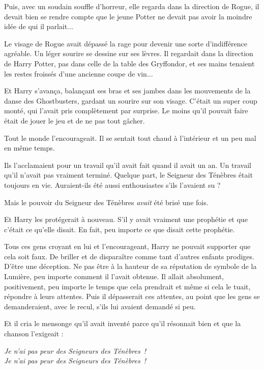 {Puis, avec un soudain souffle d'horreur, elle regarda dans la direction de Rogue, il devait bien se rendre compte que le jeune Potter ne devait pas avoir la moindre idée de qui il parlait...

Le visage de Rogue avait dépassé la rage pour devenir une sorte d'indifférence agréable. Un léger sourire se dessine sur ses lèvres. Il regardait dans la direction de Harry Potter, pas dans celle de la table des Gryffondor, et ses mains tenaient les restes froissés d'une ancienne coupe de vin...

Et Harry s'avança, balançant ses bras et ses jambes dans les mouvements de la danse des Ghostbusters, gardant un sourire sur son visage. C'était un super coup monté, qui l'avait pris complètement par surprise. Le moins qu'il pouvait faire était de jouer le jeu et de ne pas tout gâcher.

Tout le monde l'encourageait. Il se sentait tout chaud à l'intérieur et un peu mal en même temps.

Ils l'acclamaient pour un travail qu'il avait fait quand il avait un an. Un travail qu'il n'avait pas vraiment terminé. Quelque part, le Seigneur des Ténèbres était toujours en vie. Auraient-ils été aussi enthousiastes s'ils l'avaient su ?

Mais le pouvoir du Seigneur des Ténèbres \emph{avait} été brisé une fois.

Et Harry les protégerait à nouveau. S'il y avait vraiment une prophétie et que c'était ce qu'elle disait. En fait, peu importe ce que disait cette prophétie.

Tous ces gens croyant en lui et l'encourageant, Harry ne pouvait supporter que cela soit faux. De briller et de disparaître comme tant d'autres enfants prodiges. D'être une déception. Ne pas être à la hauteur de sa réputation de symbole de la Lumière, peu importe comment il l'avait obtenue. Il allait absolument, positivement, peu importe le temps que cela prendrait et même si cela le tuait, répondre à leurs attentes. Puis il dépasserait ces attentes, au point que les gens se demanderaient, avec le recul, s'ils lui avaient demandé si peu.

Et il cria le mensonge qu'il avait inventé parce qu'il résonnait bien et que la chanson l'exigeait :

\begin{center}
\emph{Je n'ai pas peur des Seigneurs des Ténèbres~!}\\
\emph{Je n'ai pas peur des Seigneurs des Ténèbres~!}
\end{center}

}
